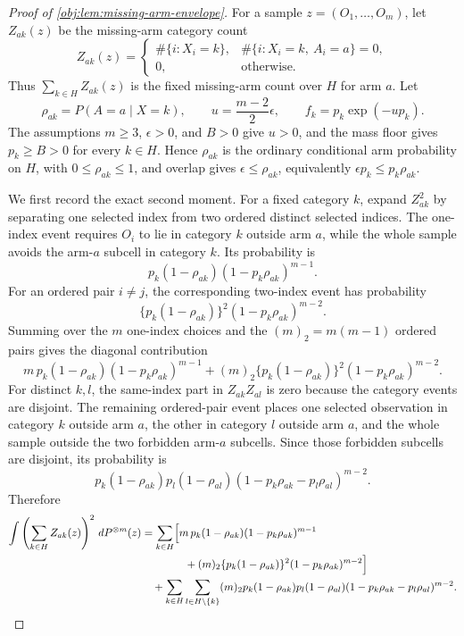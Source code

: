 \begin{proof}[Proof of \cref{obj:lem:missing-arm-envelope}]
For a sample \(z=(O_1,\ldots,O_m)\), let \(Z_{ak}(z)\) be the missing-arm category count
\[
Z_{ak}(z)=
\begin{cases}
\#\{i:X_i=k\}, & \#\{i:X_i=k,\ A_i=a\}=0,\\
0, & \text{otherwise}.
\end{cases}
\]
Thus \(\sum_{k\in H}Z_{ak}(z)\) is the fixed missing-arm count over \(H\) for arm \(a\). Let
\[
\rho_{ak}=P(A=a\mid X=k),
\qquad
u=\frac{m-2}{2}\epsilon,
\qquad
f_k=p_k\exp(-up_k).
\]
The assumptions \(m\ge3\), \(\epsilon>0\), and \(B>0\) give \(u>0\), and the mass floor gives
\(p_k\ge B>0\) for every \(k\in H\). Hence \(\rho_{ak}\) is the ordinary conditional arm probability on
\(H\), with \(0\le \rho_{ak}\le1\), and overlap gives
\(\epsilon\le \rho_{ak}\), equivalently \(\epsilon p_k\le p_k\rho_{ak}\). %

We first record the exact second moment. For a fixed category \(k\), expand \(Z_{ak}^2\) by separating
one selected index from two ordered distinct selected indices. The one-index event requires
\(O_i\) to lie in category \(k\) outside arm \(a\), while the whole sample avoids the arm-\(a\)
subcell in category \(k\). Its probability is
\[
p_k(1-\rho_{ak})(1-p_k\rho_{ak})^{m-1}.
\]
For an ordered pair \(i\ne j\), the corresponding two-index event has probability
\[
\{p_k(1-\rho_{ak})\}^2(1-p_k\rho_{ak})^{m-2}.
\]
Summing over the \(m\) one-index choices and the \((m)_2=m(m-1)\) ordered pairs gives the diagonal
contribution
\[
m\,p_k(1-\rho_{ak})(1-p_k\rho_{ak})^{m-1}
+
(m)_2\{p_k(1-\rho_{ak})\}^2(1-p_k\rho_{ak})^{m-2}.
\]
For distinct \(k,l\), the same-index part in \(Z_{ak}Z_{al}\) is zero because the category events are
disjoint. The remaining ordered-pair event places one selected observation in category \(k\) outside arm
\(a\), the other in category \(l\) outside arm \(a\), and the whole sample outside the two forbidden
arm-\(a\) subcells. Since those forbidden subcells are disjoint, its probability is
\[
p_k(1-\rho_{ak})p_l(1-\rho_{al})
(1-p_k\rho_{ak}-p_l\rho_{al})^{m-2}.
\]
Therefore
\[
\begin{aligned}
\int \left(\sum_{k\in H}Z_{ak}(z)\right)^2\,dP^{\otimes m}(z)
&=
\sum_{k\in H}
\Bigl[
m\,p_k(1-\rho_{ak})(1-p_k\rho_{ak})^{m-1}
\\
&\qquad\qquad
+
(m)_2\{p_k(1-\rho_{ak})\}^2(1-p_k\rho_{ak})^{m-2}
\Bigr]
\\
&\quad+
\sum_{k\in H}\sum_{l\in H\setminus\{k\}}
(m)_2 p_k(1-\rho_{ak})p_l(1-\rho_{al})
(1-p_k\rho_{ak}-p_l\rho_{al})^{m-2}.
\end{aligned}
\]


\end{proof}
